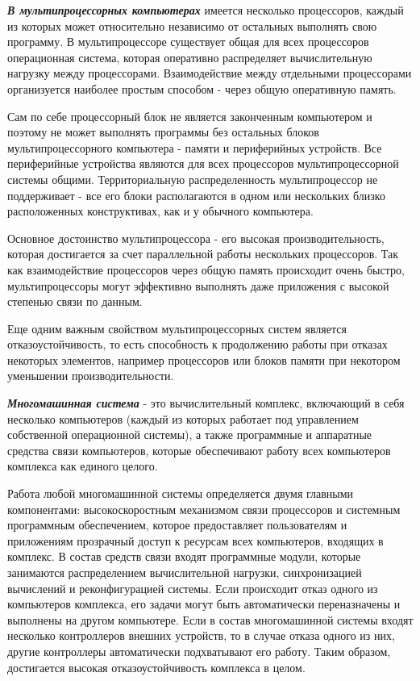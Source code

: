 \textbf{\textit{В мультипроцессорных компьютерах}} имеется несколько процессоров, каждый из которых может относительно независимо от остальных выполнять свою программу.
В мультипроцессоре существует общая для всех процессоров операционная система, которая оперативно распределяет вычислительную нагрузку между процессорами.
Взаимодействие между отдельными процессорами организуется наиболее простым способом - через общую оперативную память.

Сам по себе процессорный блок не является законченным компьютером и поэтому не может выполнять программы без остальных блоков мультипроцессорного компьютера - памяти и периферийных устройств.
Все периферийные устройства являются для всех процессоров мультипроцессорной системы общими.
Территориальную распределенность мультипроцессор не поддерживает - все его блоки располагаются в одном или нескольких близко расположенных конструктивах, как и у обычного компьютера.

Основное достоинство мультипроцессора - его высокая производительность, которая достигается за счет параллельной работы нескольких процессоров.
Так как взаимодействие процессоров через общую память происходит очень быстро, мультипроцессоры могут эффективно выполнять даже приложения с высокой степенью связи по данным.

Еще одним важным свойством мультипроцессорных систем является отказоустойчивость, то есть способность к продолжению работы при отказах некоторых элементов, например процессоров или блоков памяти при некотором уменьшении производительности.

\textbf{\textit{Многомашинная система}} - это вычислительный комплекс, включающий в себя несколько компьютеров (каждый из которых работает под управлением собственной операционной системы), а также программные и аппаратные средства связи компьютеров, которые обеспечивают работу всех компьютеров комплекса как единого целого.

Работа любой многомашинной системы определяется двумя главными компонентами: высокоскоростным механизмом связи процессоров и системным программным обеспечением, которое предоставляет пользователям и приложениям прозрачный доступ к ресурсам всех компьютеров, входящих в комплекс.
В состав средств связи входят программные модули, которые занимаются распределением вычислительной нагрузки, синхронизацией вычислений и реконфигурацией системы.
Если происходит отказ одного из компьютеров комплекса, его задачи могут быть автоматически переназначены и выполнены на другом компьютере.
Если в состав многомашинной системы входят несколько контроллеров внешних устройств, то в случае отказа одного из них, другие контроллеры автоматически подхватывают его работу.
Таким образом, достигается высокая отказоустойчивость комплекса в целом.

